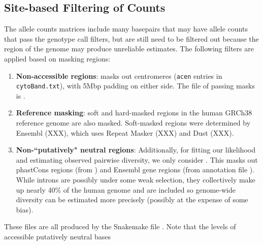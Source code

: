 \documentclass[11pt]{article}
\begin{document}
\subsection{Site-based Filtering of Counts}

The allele counts matrices include many basepairs that may have allele counts
that pass the genotype call filters, but are still need to be filtered out
because the region of the genome may produce unreliable estimates. The
following filters are applied based on masking regions:

\begin{enumerate}
  \item \textbf{Non-accessible regions}: masks out centromeres (\texttt{acen} entries in
    \texttt{cytoBand.txt}), with 5Mbp padding on either side. The file of
    passing masks is . 

  \item \textbf{Reference masking}: soft and hard-masked regions in the human
      GRCh38 reference genome are also masked. Soft-masked regions were
      determined by Ensembl (XXX), which uses Repeat Masker (XXX) and Dust
      (XXX).

  \item \textbf{Non-``putatively" neutral regions}: Additionally, for fitting our
    likelihood and estimating observed pairwise diversity, we only consider .
    This masks out phastCons regions (from
    ) and Ensembl gene regions (from
    annotation file ).  While introns
    are possibly under some weak selection, they collectively make up nearly
    40\% of the human genome and are included so genome-wide diversity can be
    estimated more precisely (possibly at the expense of some bias).
\end{enumerate}

These files are all produced by the Snakemake file .
Note that the levels of accessible putatively neutral bases 
\end{document}

